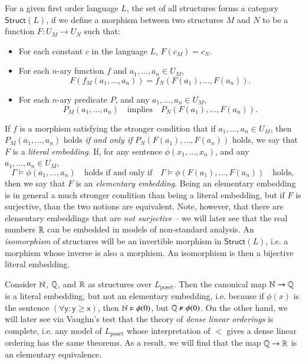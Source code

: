 For a given first order language $L$, the set of all structures forms a category $\textsf{Struct}(L)$, if we define a morphism between two structures $M$ and $N$ to be a function $F: U_M \to U_N$ such that:
%
\begin{itemize}
    \item For each constant $c$ in the language $L$, $F(c_M) = c_N$.
    \item For each $n$-ary function $f$ and $a_1,\dots,a_n \in U_M$,
    \[ F(f_M(a_1, \dots, a_n)) = f_N(F(a_1), \dots, F(a_n)). \]
    
    \item For each $n$-ary predicate $P$, and any $a_1,\dots,a_n \in U_M$,
    \[ P_M(a_1,\dots,a_n) \quad\text{implies}\quad P_N(F(a_1),\dots,F(a_n)). \]
\end{itemize}
%
If $f$ is a morphism satisfying the stronger condition that if $a_1,\dots,a_n \in U_M$, then $P_M(a_1,\dots,a_n)$ holds \emph{if and only if} $P_N(F(a_1),\dots,F(a_n))$ holds, we say that $F$ is a \emph{literal embedding}. If, for any sentence $\phi(x_1,\dots,x_n)$, and any $a_1,\dots,a_n \in U_M$,
%
\[ \Gamma \vDash \phi(a_1,\dots,a_n) \quad\text{holds if and only if}\quad \Gamma \vDash \phi(F(a_1),\dots,F(a_n))\quad\text{holds}, \]
%
then we say that $F$ is an \emph{elementary embedding}. Being an elementary embedding is in general a much stronger condition than being a literal embedding, but if $F$ is surjective, than the two notions are equivalent. Note, however, that there are elementary embeddings that are \emph{not surjective} -- we will later see that the real numbers $\operatorname{\mathbb{R}}$ can be embedded in models of non-standard analysis. An \emph{isomorphism} of structures will be an invertible morphism in $\textsf{Struct}(L)$, i.e. a morphism whose inverse is also a morphism. An isomorphism is then a bijective literal embedding.

\begin{example}
    Consider $\operatorname{\mathbb{N}}$, $\operatorname{\mathbb{Q}}$, and $\operatorname{\mathbb{R}}$ as structures over $L_{\text{poset}}$. Then the canonical map $\operatorname{\mathbb{N}} \to \operatorname{\mathbb{Q}}$ is a literal embedding, but not an elementary embedding, i.e. because if $\phi(x)$ is the sentence $\mathsf{(\forall y: y \geq x)}$, then $\operatorname{\mathbb{N}} \vDash \phi(0)$, but $\operatorname{\mathbb{Q}} \not \vDash \phi(0)$. On the other hand, we will later see via Vaughn's test that the theory of \emph{dense linear orderings} is complete, i.e. any model of $L_{\text{poset}}$ whose interpretation of $<$ gives a dense linear ordering has the same theorems. As a result, we will find that the map $\operatorname{\mathbb{Q}} \to \operatorname{\mathbb{R}}$ is an elementary equivalence.
\end{example}

